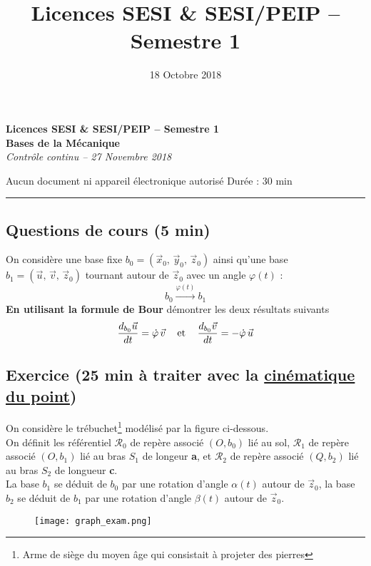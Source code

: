 \documentclass[a4paper,12pt]{article}
\title{\large{Licences SESI \& SESI/PEIP -- Semestre 1}}%
\date{\large{18 Octobre 2018}}
\begin{document}
\begin{center}
	\textbf{Licences SESI \& SESI/PEIP -- Semestre 1} \\[2mm]
	\large{\textbf{Bases de la Mécanique}} \\[1mm]
	\textit{Contrôle continu -- 27 Novembre 2018}
\end{center}
\begin{flushleft}
Aucun document ni appareil électronique autorisé \hfill Durée : 30 min
\end{flushleft}
\hrule
\vspace{2mm}
\subsection*{Questions de cours (5 min)}
On considère une base fixe $b_0 = \left(\vec{x}_0,\, \vec{y}_0,\, \vec{z}_0 \right)$ ainsi qu'une base $b_1 = \left( \vec{u},\, \vec{v},\, \vec{z}_0 \right)$ tournant autour de $\vec{z}_0$ avec un angle $\varphi(t)$ : $$ b_0 \xrightarrow{\varphi(t)} b_1 $$
\noindent \textbf{En utilisant la formule de Bour} démontrer les deux résultats suivants
	\begin{equation*}
		\frac{d_{b_0} \vec{u}}{dt} = \dot{\varphi}\, \vec{v} \text{\hspace{3mm} et \hspace{3mm}} \frac{d_{b_0} \vec{v}}{dt} = -\dot{\varphi}\, \vec{u}
	\end{equation*}
	

\subsection*{Exercice (25 min à traiter avec la \underline{cinématique du point})}
\noindent On considère le trébuchet\footnote{Arme de siège du moyen âge qui consistait à projeter des pierres} modélisé par la figure ci-dessous. \\[2mm]
On définit les référentiel $\mathcal{R}_0$ de repère associé $(O, b_0)$ lié au sol, $\mathcal{R}_1$ de repère associé $(O, b_1)$ lié au bras $S_1$ de longeur \textbf{a}, et $\mathcal{R}_2$ de repère associé $(Q, b_2)$ lié au bras $S_2$ de longueur \textbf{c}. \\[2mm]
La base $b_1$ se déduit de $b_0$ par une rotation d'angle $\alpha(t)$ autour de $\vec{z}_0$, la base $b_2$ se déduit de $b_1$ par une rotation d'angle $\beta(t)$ autour de $\vec{z}_0$.

\begin{figure}[!ht]
\centering
\texttt{[image: graph\_exam.png]}

\end{figure}
\end{document}
